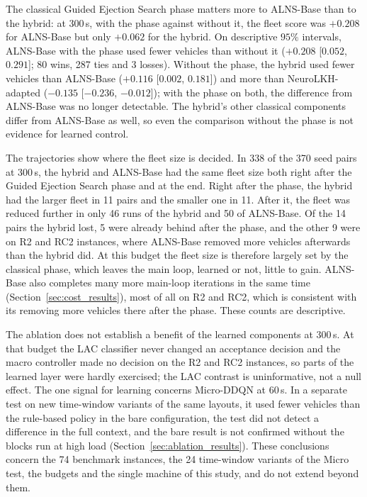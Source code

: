 \documentclass{ieeeaccess}
\begin{document}
The classical Guided Ejection Search phase matters more to ALNS-Base than to the hybrid: at 300\,s, with the phase against without it, the fleet score was $+0.208$ for ALNS-Base but only $+0.062$ for the hybrid. On descriptive $95\%$ intervals, ALNS-Base with the phase used fewer vehicles than without it ($+0.208$ [$0.052$, $0.291$]; 80 wins, 287 ties and 3 losses). Without the phase, the hybrid used fewer vehicles than ALNS-Base ($+0.116$ [$0.002$, $0.181$]) and more than NeuroLKH-adapted ($-0.135$ [$-0.236$, $-0.012$]); with the phase on both, the difference from ALNS-Base was no longer detectable. The hybrid's other classical components differ from ALNS-Base as well, so even the comparison without the phase is not evidence for learned control.

The trajectories show where the fleet size is decided. In 338 of the 370 seed pairs at 300\,s, the hybrid and ALNS-Base had the same fleet size both right after the Guided Ejection Search phase and at the end. Right after the phase, the hybrid had the larger fleet in 11 pairs and the smaller one in 11. After it, the fleet was reduced further in only 46 runs of the hybrid and 50 of ALNS-Base. Of the 14 pairs the hybrid lost, 5 were already behind after the phase, and the other 9 were on R2 and RC2 instances, where ALNS-Base removed more vehicles afterwards than the hybrid did. At this budget the fleet size is therefore largely set by the classical phase, which leaves the main loop, learned or not, little to gain. ALNS-Base also completes many more main-loop iterations in the same time (Section~\ref{sec:cost_results}), most of all on R2 and RC2, which is consistent with its removing more vehicles there after the phase. These counts are descriptive.

The ablation does not establish a benefit of the learned components at 300\,s. At that budget the LAC classifier never changed an acceptance decision and the macro controller made no decision on the R2 and RC2 instances, so parts of the learned layer were hardly exercised; the LAC contrast is uninformative, not a null effect. The one signal for learning concerns Micro-DDQN at 60\,s. In a separate test on new time-window variants of the same layouts, it used fewer vehicles than the rule-based policy in the bare configuration, the test did not detect a difference in the full context, and the bare result is not confirmed without the blocks run at high load (Section~\ref{sec:ablation_results}). These conclusions concern the 74 benchmark instances, the 24 time-window variants of the Micro test, the budgets and the single machine of this study, and do not extend beyond them.
\end{document}
